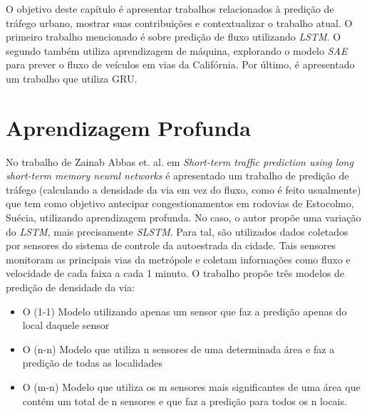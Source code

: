 


\label{chapter:trabalhos_relacionados}

O objetivo deste capítulo é apresentar trabalhos relacionados à predição de tráfego urbano, mostrar suas contribuições e contextualizar o trabalho atual. O primeiro trabalho mencionado é sobre predição de fluxo utilizando \textit{\acrshort{LSTM}}. O segundo também utiliza aprendizagem de máquina, explorando o modelo \textit{\acrshort{SAE}} para prever o fluxo de veículos em vias da Califórnia. Por último, é apresentado um trabalho que utiliza \acrshort{GRU}.

\section{Aprendizagem Profunda}

No trabalho de Zainab Abbas et. al. em \textit{Short-term traffic prediction using long short-term memory neural networks} \cite{Zainab_2018} é apresentado um trabalho de predição de tráfego (calculando a densidade da via em vez do fluxo, como é feito usualmente) que tem como objetivo antecipar congestionamentos em rodovias de Estocolmo, Suécia, utilizando aprendizagem profunda. No caso, o autor propõe uma variação do \textit{\acrshort{LSTM}}, mais precisamente \textit{\acrfull{SLSTM}}. Para tal, são utilizados dados coletados por sensores do sistema de controle da autoestrada da cidade. Tais sensores monitoram as principais vias da metrópole e coletam informações como fluxo e velocidade de cada faixa a cada 1 minuto. O trabalho propõe três modelos de predição de densidade da via:
 
\begin{itemize}
    \item O (1-1) Modelo utilizando apenas um sensor que faz a predição apenas do local daquele sensor
    \item O (n-n) Modelo que utiliza n sensores de uma determinada área e faz a predição de todas as localidades
    \item O (m-n) Modelo que utiliza os m sensores mais significantes de uma área que contém um total de n sensores e que faz a predição para todos os n locais.
\end{itemize}

